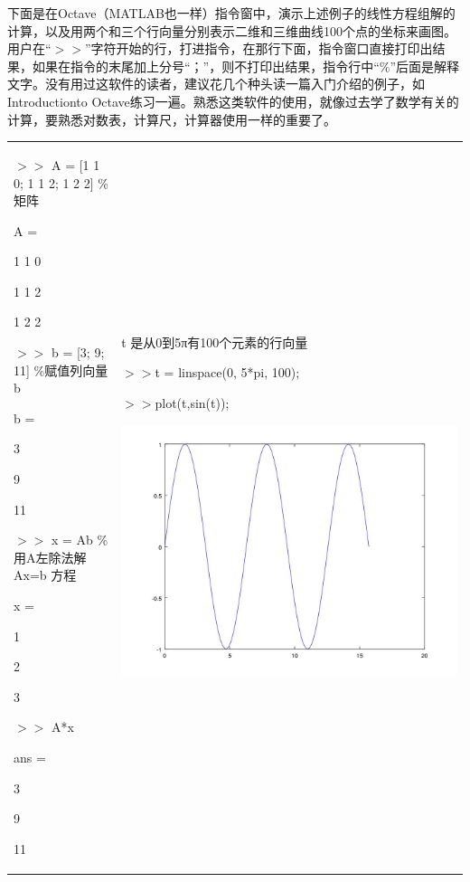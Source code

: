 下面是在Octave（MATLAB也一样）指令窗中，演示上述例子的线性方程组解的计算，以及用两个和三个行向量分别表示二维和三维曲线100个点的坐标来画图。用户在“$ >> $”字符开始的行，打进指令，在那行下面，指令窗口直接打印出结果，如果在指令的末尾加上分号“；”，则不打印出结果，指令行中“\%”后面是解释文字。没有用过这软件的读者，建议花几个种头读一篇入门介绍的例子，如Introductionto Octave练习一遍。熟悉这类软件的使用，就像过去学了数学有关的计算，要熟悉对数表，计算尺，计算器使用一样的重要了。
\begin{table}[htbp]
	\setlength{\abovecaptionskip}{0.cm}%
	\centering
	\setlength{\tabcolsep}{2pt}
	
\begin{tabular}{|p{170 pt}|p{170 pt}|}

	\hline
	$ >> $ A = [1 1 0;  1 1 2; 1 2 2] \%矩阵
	
	A =
	
	1    1   0
	
	1    1   2
	
	1    2   2
	
	$ >> $ b = [3;  9; 11]  \%赋值列向量 b
	
	b =
	
	3
	
	9
	
	11
	
	$ >> $ x = Ab  \%用A左除法解 Ax=b 方程
	
	x =
	
	1
	
	2
	
	3
	
	$ >> $ A*x  %
	
	ans =
	
	3
	
	9
	
	11
	
	&
	
	t 是从0到5π有100个元素的行向量
	
	$ >> $t =  linspace(0, 5*pi, 100);  
	
	$ >> $plot(t,sin(t));                   
	
	\includegraphics[width = .4\textwidth]{pic/154012hzzaaow33s7a7kst.jpg}
	

\end{tabular}
\end{table}

